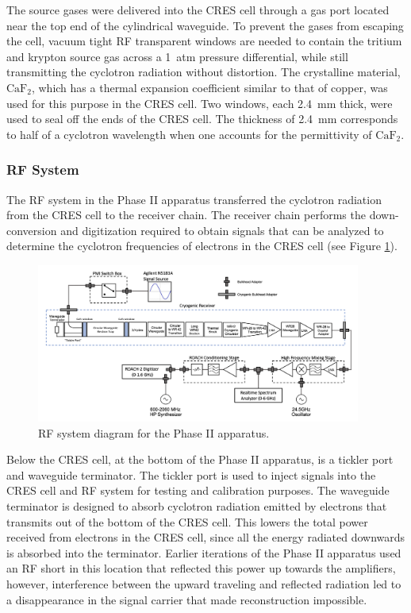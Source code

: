 The source gases were delivered into the CRES cell through a gas port located near the top end of the cylindrical waveguide. To prevent the gases from escaping the cell, vacuum tight RF transparent windows are needed to contain the tritium and krypton source gas across a 1~atm pressure differential, while still transmitting the cyclotron radiation without distortion. The crystalline material, $\mathrm{CaF}_2$, which has a thermal expansion coefficient similar to that of copper, was used for this purpose in the CRES cell. Two windows, each 2.4~mm thick, were used to seal off the ends of the CRES cell. The thickness of 2.4~mm corresponds to half of a cyclotron wavelength when one accounts for the permittivity of $\mathrm{CaF}_2$.

\subsubsection*{RF System}

The RF system in the Phase II apparatus transferred the cyclotron radiation from the CRES cell to the receiver chain. The receiver chain performs the down-conversion and digitization required to obtain signals that can be analyzed to determine the cyclotron frequencies of electrons in the CRES cell (see Figure \ref{fig:chap3-phase2-rf-chain}).
\begin{figure}[htbp]
    \centering
    \includegraphics*[width=0.95\textwidth]{figs/Chapter-3/230620_phase2_rf_chain.png}
    \caption{\label{fig:chap3-phase2-rf-chain} RF system diagram for the Phase II apparatus.}
\end{figure}

Below the CRES cell, at the bottom of the Phase II apparatus, is a tickler port and waveguide terminator. The tickler port is used to inject signals into the CRES cell and RF system for testing and calibration purposes. The waveguide terminator is designed to absorb cyclotron radiation emitted by electrons that transmits out of the bottom of the CRES cell. This lowers the total power received from electrons in the CRES cell, since all the energy radiated downwards is absorbed into the terminator. Earlier iterations of the Phase II apparatus used an RF short in this location that reflected this power up towards the amplifiers, however, interference between the upward traveling and reflected radiation led to a disappearance in the signal carrier that made reconstruction impossible.

